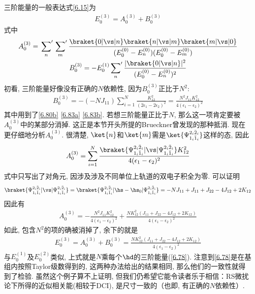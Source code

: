 三阶能量的一般表达式\eqref{6.15}为
\begin{align}
E_0^{(3)} = A_0^{(3)} + B_{0}^{(3)}
\end{align}
式中
\begin{gather}
A_0^{(3)} = \sideset{}{'}\sum_n \sideset{}{'}\sum_m \frac{\braket{0|\vs|n}\braket{n|\vs|m}\braket{m|\vs|0}}{(E_0^{(0)} - E_n^{(0)}) (E_0^{(0)} - E_m^{(0)}) }\\
B_0^{(3)} = -E_0^{(1)}\sideset{}{'}{\sum}_n\frac{|\braket{0|\vs|n}|^2}{(E_0^{(0)} - E_n^{(0)})^2}
\end{gather}
初看, 
三阶能量好像没有正确的$N$依赖性, 
因为$B_0^{(3)}$正比于$N^2$:
\begin{align}
B_0^{(3)} = -(-NJ_{11}) \sum_{i=1}^{N} \frac{K_{12}^2}{(2\epsilon_1 - 2\epsilon_2)^2} = \frac{N^2J_{11}K_{12}^2}{4(\epsilon_1-\epsilon_2)^2}
\end{align}
其中用到了\autoref{6.80b} \autoref{6.83a} \autoref{6.83b}. 
若想三阶能量正比于$N$, 
那么这一项肯定要被$A_0^{(3)}$中的某部分消掉. 
这正是本节开头所提的Brueckner曾发现的那种抵消. 
现在更仔细地分析$A_0^{(3)}$.  
很清楚, 
$\ket{n}$和$\ket{m}$需是$\ket{\Psi_{1_i\bar{1}_i}^{2_i\bar{2}_i}}$这样的态, 
因此
\begin{align}
A_0^{(3)} = \sum_{i=1}^{N} \frac{\braket{\Psi_{1_i\bar{1}_i}^{2_i\bar{2}_i}|\vs|\Psi_{1_i\bar{1}_i}^{2_i\bar{2}_i}}K_{12}^2}{4(\epsilon_1 - \epsilon_2)^2}
\end{align}
式中只写出了对角元, 
因涉及涉及不同单位上轨道的双电子积全为零. 
可以证明
\begin{align}\braket{\Psi_{1_i\bar{1}_i}^{2_i\bar{2}_i}|\vs|\Psi_{1_i\bar{1}_i}^{2_i\bar{2}_i}} = \braket{\Psi_{1_i\bar{1}_i}^{2_i\bar{2}_i}|\hs-\hs_0|\Psi_{1_i\bar{1}_i}^{2_i\bar{2}_i}}=-NJ_{11} + J_{11} + J_{22} - 4J_{12} + 2K_{12}
\label{6.90}
\end{align}
因此有
\begin{align}
A_0^{(3)} = - \frac{N^2J_{11}K_{12}^2}{4(\epsilon_1 - \epsilon_2)^2} + \frac{NK_{12}^2(J_{11} + J_{22} - 4J_{12} + 2K_{12})}{4(\epsilon_1 - \epsilon_2)^2}
\end{align}
如此, 
包含$N^2$的项的确被消掉了, 
余下的就是
\begin{align}
E_0^{(3)} = A_0^{(3)} + B_0^{(3)} = \frac{NK_{12}^2(J_{11} + J_{22} - 4J_{12} + 2K_{12})}{4(\epsilon_1 - \epsilon_2)^2}
\label{eq:6.92}
\end{align}
与$E_0^{(1)}$及$E_0^{(2)}$类似, 
上式就是$N$乘每个$\hd$的三阶能量(\autoref{6.78}). 
注意到\autoref{6.78}是在基组内按照Taylor级数得到的, 
这两种办法给出的结果相同, 
那么他们的一致性就得到了检验. 
虽然这个例子算不上证明, 
但我们仍希望它能令读者乐于相信：RS微扰论下所得的近似相关能(相较于DCI), 
是尺寸一致的（也即, 
有正确的$N$依赖性）. 


